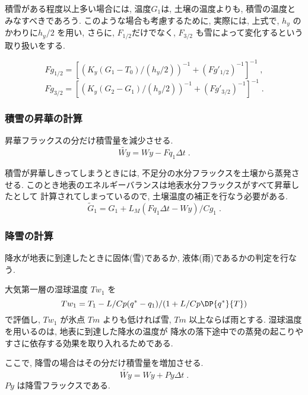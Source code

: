 積雪がある程度以上多い場合には, 
温度$G_1$は, 土壌の温度よりも, 積雪の温度とみなすべきであろう.
このような場合も考慮するために, 実際には, 
上式で, $h_y$ のかわりに$h_y/2$ を用い, 
さらに, $F_{1/2}$だけでなく, $F_{3/2}$ も雪によって変化するという
取り扱いをする.

\begin{equation}
  Fg_{1/2} = \left[ \left( K_y (G_1-T_0)/(h_y/2) \right)^{-1} 
                    +  (Fg'_{1/2})^{-1}
                \right]^{-1} \; ,
\end{equation}
\begin{equation}
  Fg_{3/2} = \left[ \left( K_y (G_2-G_1)/(h_y/2) \right)^{-1} 
                    +  (Fg'_{3/2})^{-1}
                \right]^{-1} \; .
\end{equation}

\subsubsection{積雪の昇華の計算}

昇華フラックスの分だけ積雪量を減少させる. 
\begin{equation}
  \tilde{Wy} = Wy - Fq_1 \Delta t \; .
\end{equation}

積雪が昇華しきってしまうときには, 不足分の水分フラックスを土壌から蒸発させる. 
このとき地表のエネルギーバランスは地表水分フラックスがすべて昇華したとして
計算されてしまっているので, 土壌温度の補正を行なう必要がある. 
\begin{equation}
  \tilde{G}_1 = G_1 + L_M ( Fq_1 \Delta t - Wy ) / Cg_1 \; .
\end{equation}

\subsubsection{降雪の計算}

降水が地表に到達したときに固体(雪)であるか, 液体(雨)であるかの判定を行なう. 

大気第一層の湿球温度 $Tw_1$ を
\begin{equation}
Tw_1 = T_1 - L / Cp ( q^* - q_1 ) / ( 1 + L / Cp \DP{q^*}{T} )
\end{equation}
で評価し, $Tw_1$ が氷点 $Tm$ よりも低ければ雪, $Tm$ 以上ならば雨とする. 
湿球温度を用いるのは, 地表に到達した降水の温度が
降水の落下途中での蒸発の起こりやすさに依存する効果を取り入れるためである. 

ここで, 降雪の場合はその分だけ積雪量を増加させる. 
\begin{equation}
\tilde{Wy} = Wy + Py \Delta t \; .
\end{equation}
$Py$ は降雪フラックスである. 

